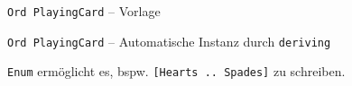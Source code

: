 \documentclass{beamer}
\begin{document}
\begin{frame}{\texttt{Ord PlayingCard} -- Vorlage}
\end{frame}

\begin{frame}{\texttt{Ord PlayingCard} -- Automatische Instanz durch \texttt{deriving}}

  \texttt{Enum} ermöglicht es, bspw. \texttt{[Hearts .. Spades]} zu schreiben.
\end{frame}
\end{document}

